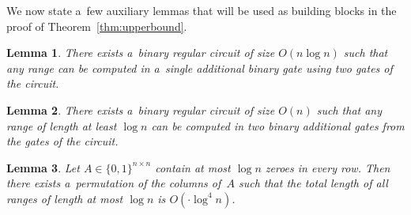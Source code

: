 \documentclass[11pt,letterpaper]{article}
\newtheorem{lemma}{Lemma}
\begin{document}
We now state a~few auxiliary lemmas that will be
used as building blocks in the proof of Theorem~\ref{thm:upperbound}.


\begin{lemma}\label{lemma:decompose}
There exists a~binary regular circuit of size $O(n\log n)$ such that
any range can be computed in a~single additional binary gate
using two gates of the circuit.
\end{lemma}

\begin{lemma}\label{lemma:blocks}
There exists a~binary regular circuit of size $O(n)$ such 
that any range
of length at least $\log n$ can be computed in two binary
additional gates from the gates of the circuit.
\end{lemma}

\begin{lemma}\label{lemma:permute}
Let $A \in \{0,1\}^{n \times n}$ contain at most $\log n$ 
zeroes in
every row. Then there exists a~permutation of the columns of~$A$
such that the total length of all ranges of length
at most $\log n$ is $O(\cdot \log^4 n)$.
\end{lemma}
\end{document}
